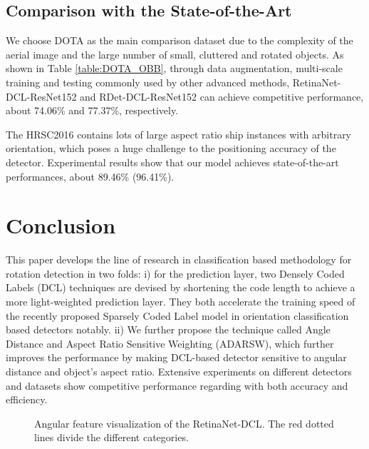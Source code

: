 \documentclass[final]{cvpr}
\begin{document}
\subsection{Comparison with the State-of-the-Art}
We choose DOTA as the main comparison dataset due to the complexity of the aerial image and the large number of small, cluttered and rotated objects. As shown in Table \ref{table:DOTA_OBB}, through data augmentation, multi-scale training and testing commonly used by other advanced methods, RetinaNet-DCL-ResNet152 and RDet-DCL-ResNet152 can achieve competitive performance, about 74.06\% and 77.37\%, respectively.

The HRSC2016 contains lots of large aspect ratio ship instances with arbitrary orientation, which poses a huge challenge to the positioning accuracy of the detector. Experimental results show that our model achieves state-of-the-art performances, about 89.46\% (96.41\%).

\section{Conclusion}
This paper develops the line of research in classification based methodology for rotation detection in two folds: i) for the prediction layer, two Densely Coded Labels (DCL) techniques are devised by shortening the code length to achieve a more light-weighted prediction layer. They both accelerate the training speed of the recently proposed Sparsely Coded Label model in orientation classification based detectors notably. ii) We further propose the technique called Angle Distance and Aspect Ratio Sensitive Weighting (ADARSW), which further improves the performance by making DCL-based detector sensitive to angular distance and object's aspect ratio. Extensive experiments on different detectors and datasets show competitive performance regarding with both accuracy and efficiency.

\begin{figure}[!tb]
		\centering
		\centering
		\caption{Angular feature visualization of the RetinaNet-DCL. The red dotted lines divide the different categories.}
		\label{fig:feature_vis}
\end{figure}



{\small


}
\end{document}
